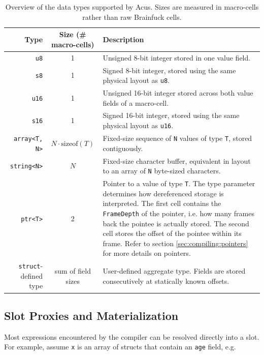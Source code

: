 \begin{table}[H]
\centering
\begin{tabularx}{\textwidth}{r c X}
\hline
\textbf{Type} & \textbf{Size (\# macro-cells)} & \textbf{Description} \\
\hline
\texttt{u8} &
1 &
Unsigned 8-bit integer stored in one value field. \\

\texttt{s8} &
1 &
Signed 8-bit integer, stored using the same physical layout as \texttt{u8}. \\

\texttt{u16} &
1 &
Unsigned 16-bit integer stored across both value fields of a macro-cell. \\

\texttt{s16} &
1 &
Signed 16-bit integer, stored using the same physical layout as \texttt{u16}. \\

\texttt{array<T, N>} &
$N \cdot \mathrm{sizeof}(T)$ &
Fixed-size sequence of \texttt{N} values of type \texttt{T}, stored contiguously. \\

\texttt{string<N>} &
$N$ &
Fixed-size character buffer, equivalent in layout to an array of \texttt{N} byte-sized characters. \\

\texttt{ptr<T>} &
2 &
Pointer to a value of type \texttt{T}. The type parameter determines how dereferenced storage is interpreted. The first cell contains the \texttt{FrameDepth} of the pointer, i.e. how many frames back the pointee is actually stored. The second cell stores the offset of the pointee within its frame. Refer to section \ref{sec:compiling:pointers} for more details on pointers. \\

\texttt{struct}-defined type &
sum of field sizes &
User-defined aggregate type. Fields are stored consecutively at statically known offsets. \\
\hline
\end{tabularx}
\caption{Overview of the data types supported by Acus. Sizes are measured in macro-cells rather than raw Brainfuck cells.}
\label{tab:acus-types}
\end{table}

\subsection{Slot Proxies and Materialization}
Most expressions encountered by the compiler can be resolved directly into a slot. For example, assume \texttt{x} is an array of structs that contain an \texttt{age} field, e.g. 


